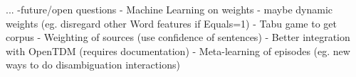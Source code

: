 ...
-future/open questions
 - Machine Learning on weights
 - maybe dynamic weights (eg. disregard other Word features if Equals=1)
 - Tabu game to get corpus
 - Weighting of sources (use confidence of sentences)
 - Better integration with OpenTDM (requires documentation)
 - Meta-learning of episodes (eg. new ways to do disambiguation interactions)
